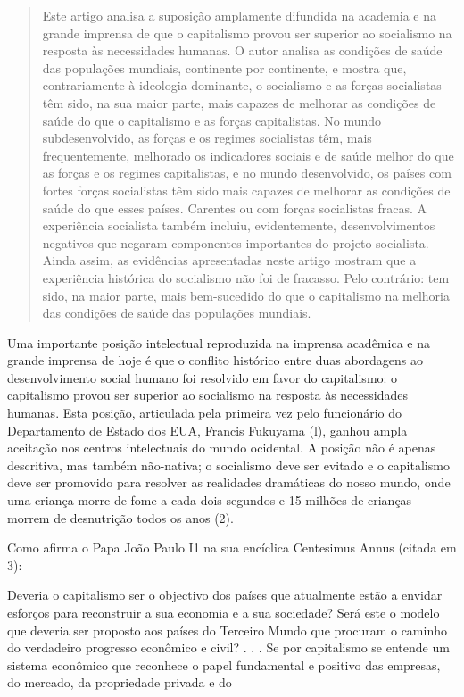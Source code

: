 \documentclass[twocolumn,amsmath,amssymb,aps,pre,floatfix]{revtex4-2}
\begin{document}
\title{}
\author{Vicente Navarro}
\begin{abstract}Este artigo analisa a suposição amplamente difundida na academia e na grande imprensa de que o capitalismo provou ser superior ao socialismo na resposta às necessidades humanas. O autor analisa as condições de saúde das populações mundiais, continente por continente, e mostra que, contrariamente à ideologia dominante, o socialismo e as forças socialistas têm sido, na sua maior parte, mais capazes de melhorar as condições de saúde do que o capitalismo e as forças capitalistas. No mundo subdesenvolvido, as forças e os regimes socialistas têm, mais frequentemente, melhorado os indicadores sociais e de saúde melhor do que as forças e os regimes capitalistas, e no mundo desenvolvido, os países com fortes forças socialistas têm sido mais capazes de melhorar as condições de saúde do que esses países. Carentes ou com forças socialistas fracas. A experiência socialista também incluiu, evidentemente, desenvolvimentos negativos que negaram componentes importantes do projeto socialista. Ainda assim, as evidências apresentadas neste artigo mostram que a experiência histórica do socialismo não foi de fracasso. Pelo contrário: tem sido, na maior parte, mais bem-sucedido do que o capitalismo na melhoria das condições de saúde das populações mundiais.\end{abstract}
Uma importante posição intelectual reproduzida na imprensa acadêmica e na grande imprensa de hoje é que o conflito histórico entre duas abordagens ao desenvolvimento social humano foi resolvido em favor do capitalismo: o capitalismo provou ser superior ao socialismo na resposta às necessidades humanas. Esta posição, articulada pela primeira vez pelo funcionário do Departamento de Estado dos EUA, Francis Fukuyama (l), ganhou ampla aceitação nos centros intelectuais do mundo ocidental. A posição não é apenas descritiva, mas também não-nativa; o socialismo deve ser evitado e o capitalismo deve ser promovido para resolver as realidades dramáticas do nosso mundo, onde uma criança morre de fome a cada dois segundos e 15 milhões de crianças morrem de desnutrição todos os anos (2).
\par
Como afirma o Papa João Paulo I1 na sua encíclica Centesimus Annus (citada em 3):
\par
Deveria o capitalismo ser o objectivo dos países que atualmente estão a envidar esforços para reconstruir a sua economia e a sua sociedade? Será este o modelo que deveria ser proposto aos países do Terceiro Mundo que procuram o caminho do verdadeiro progresso econômico e civil? . . . Se por capitalismo se entende um sistema econômico que reconhece o papel fundamental e positivo das empresas, do mercado, da propriedade privada e do
\end{document}
